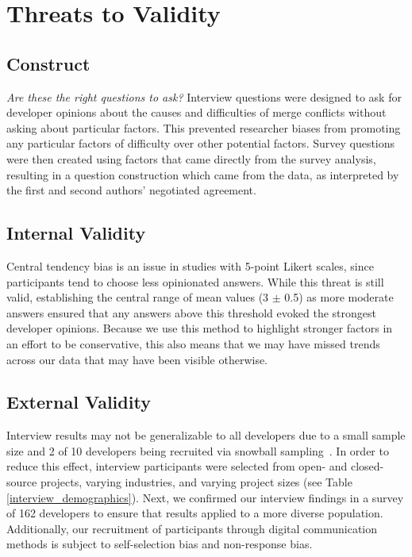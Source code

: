 \section{Threats to Validity}\label{threats}
\subsection{Construct}
\textit{Are these the right questions to ask?} Interview questions were designed to ask for developer opinions about the causes and difficulties of merge conflicts without asking about particular factors. This prevented researcher biases from promoting any particular factors of difficulty over other potential factors. 
Survey questions were then created using factors that came directly from the survey analysis, resulting in a question construction which came from the data, as interpreted by the first and second authors' negotiated agreement.
\subsection{Internal Validity}
Central tendency bias \cite{guilford1954psychometric} is an issue in studies with 5-point Likert scales, since participants tend to choose less opinionated answers. While this threat is still valid, establishing the central range of mean values (3 $\pm$ 0.5) as more moderate answers ensured that any answers above this threshold evoked the strongest developer opinions. Because we use this method to highlight stronger factors in an effort to be conservative, this also means that we may have missed trends across our data that may have been visible otherwise.

\subsection{External Validity}
Interview results may not be generalizable to all developers due to a small sample size and 2 of 10 developers being recruited via snowball sampling~\cite{goodman1961snowball}. In order to reduce this effect, interview participants were selected from open- and closed-source projects, varying industries, and varying project sizes (see Table \ref{interview_demographics}). Next, we confirmed our interview findings in a survey of 162 developers to ensure that results applied to a more diverse population. Additionally, our recruitment of participants through digital communication methods is subject to self-selection bias and non-response bias.

